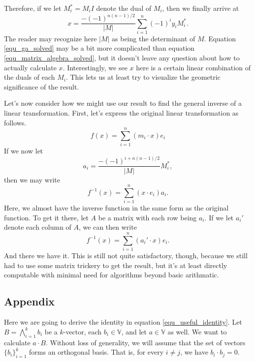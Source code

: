 \documentclass{birkjour}
\newcommand{\V}{\mathbb{V}}
\begin{document}
Therefore, if we let $M_i^{*}=M_iI$ denote the dual of $M_i$, then we finally arrive at
\begin{equation}\label{equ_ga_solved}
x = \frac{-(-1)^{n(n-1)/2}}{|M|}\sum_{i=1}^n (-1)^i y_i M_i^{*}.
\end{equation}
The reader may recognize here $|M|$ as being the determinant of $M$.  Equation \eqref{equ_ga_solved}
may be a bit more complicated than equation \eqref{equ_matrix_algebra_solved}, but it doesn't leave
any question about how to actually calculate $x$.  Interestingly, we see $x$ here is a certain linear
combination of the duals of each $M_i$.  This lets us at least try to visualize the geometric significance
of the result.

Let's now consider how we might use our result to find the general inverse of a linear transformation.
First, let's express the original linear transformation as follows.
\begin{equation}
f(x) = \sum_{i=1}^n (m_i\cdot x)e_i
\end{equation}
If we now let
\begin{equation}
a_i = \frac{-(-1)^{i+n(n-1)/2}}{|M|}M_i^{*},
\end{equation}
then we may write
\begin{equation}
f^{-1}(x)=\sum_{i=1}^n (x\cdot e_i)a_i.
\end{equation}
Here, we almost have the inverse function in the same form as the original function.
To get it there, let $A$ be a matrix with each row being $a_i$.  If we let $a_i'$ denote
each column of $A$, we can then write
\begin{equation}
f^{-1}(x)=\sum_{i=1}^n (a_i'\cdot x)e_i.
\end{equation}
And there we have it.  This is still not quite satisfactory, though, because we still had to use some
matrix trickery to get the result, but it's at least directly computable with minimal need for algorithms
beyond basic arithmatic.

\subsection*{Appendix}

Here we are going to derive the identity in equation \eqref{equ_useful_identity}.
Let $B=\bigwedge_{i=1}^k b_i$ be a $k$-vector, each $b_i\in\V$, and let $a\in\V$ as well.
We want to calculate $a\cdot B$.  Without loss of generality, we will assume that the set
of vectors $\{b_i\}_{i=1}^k$ forms an orthogonal basis.  That is, for every $i\neq j$, we
have $b_i\cdot b_j=0$.
\end{document}

